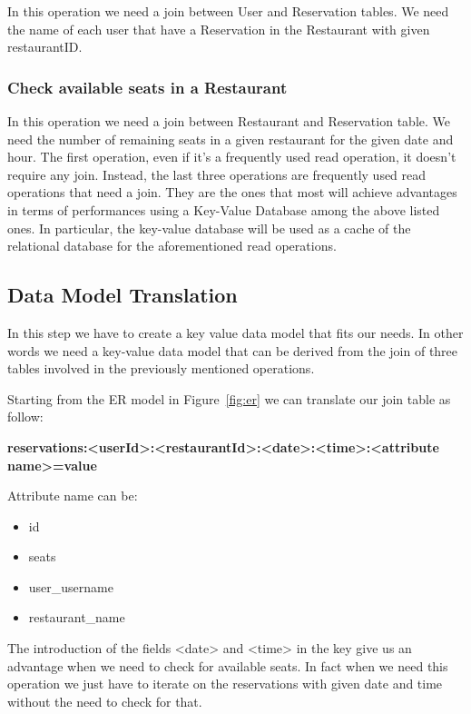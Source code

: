 In this operation we need a join between User and Reservation tables.  We need
the name of each user that have a Reservation in the Restaurant with given
restaurantID.

\subsubsection{Check available seats in a Restaurant}

In this operation we need a join between Restaurant and Reservation table. We
need the number of remaining seats in a given restaurant for the given date and
hour.
\vspace{0.75cm}
The first operation, even if it's a frequently used read operation, it doesn't
require any join.  Instead, the last three operations are frequently
used read operations that need a join. They are the ones that most will achieve
advantages in terms of performances using a Key-Value Database among the above
listed ones. In particular, the key-value database will be used as a cache of
the relational database for the aforementioned read operations.

\subsection{Data Model Translation}

In this step we have to create a key value data model that fits our needs.  In
other words we need a key-value data model that can be derived from the join of
three tables involved in the previously mentioned operations.

Starting from the ER model in Figure~\ref{fig:er} we can translate our join
table as follow:

\vspace{0.75cm}

\centerline{\textbf{reservations:<userId>:<restaurantId>:<date>:<time>:<attribute name>=value}}

\vspace{0.75cm}

Attribute name can be:
\begin{itemize}
	\item id
	\item seats
	\item user\_username
	\item restaurant\_name
\end{itemize}

\vspace{0.75cm}
The introduction of the fields <date> and <time> in the key give us an advantage 
when we need to check for available seats. In fact when we need this operation
we just have to iterate on the reservations with given date and time without the
need to check for that. 

\vfill
